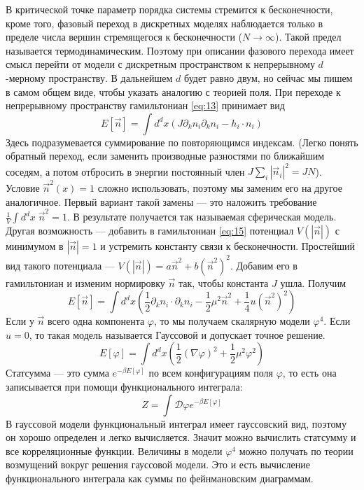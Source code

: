 \documentclass[a4paper,12pt]{article}
\theoremstyle{definition}
\theoremstyle{definition}
\theoremstyle{definition}
\begin{document}
В критической точке параметр порядка системы стремится к бесконечности, кроме того, фазовый переход в дискретных моделях наблюдается только в пределе числа вершин стремящегося к бесконечности ($N\to \infty$). Такой предел называется термодинамическим. Поэтому при описании фазового перехода имеет смысл перейти от модели с дискретным пространством  к непрерывному $d$-мерному пространству. В дальнейшем $d$ будет равно двум, но сейчас мы пишем в самом общем виде, чтобы указать аналогию с теорией поля.
При переходе к непрерывному пространству гамильтониан \eqref{eq:13} принимает вид
\begin{equation}
  \label{eq:15}
  E[\vec n]=\int d^d x \left(J\partial_kn_i\partial_k  n_i-h_i\cdot n_i\right)
\end{equation}
Здесь подразумевается суммирование по повторяющимся индексам. (Легко понять обратный переход, если заменить производные разностями по ближайшим соседям, а потом отбросить в энергии постоянный член $J\sum_i \left|\vec n_i\right|^2=JN$).
Условие $\vec n^2(x)=1$ сложно использовать, поэтому мы заменим его на другое аналогичное. Первый вариант такой замены --- это наложить требование $\frac{1}{V}\int d^dx\; \vec n^2=1$. В результате получается так называемая сферическая модель. Другая возможность --- добавить в гамильтониан \eqref{eq:15} потенциал $V(\left|\vec n\right|)$ с минимумом в $\left|\vec n\right|=1$ и устремить константу связи к бесконечности. Простейший вид такого потенциала --- $V(\left|\vec n\right|)=a\vec n^2+b\left(\vec n^2\right)^2$. Добавим его в гамильтониан и изменим нормировку $\vec n$ так, чтобы константа $J$ ушла. Получим
\begin{equation}
  \label{eq:16}
  E[\vec n]=\int d^d x \left(\frac{1}{2}\partial_k n_i\cdot \partial_k n_i-\frac{1}{2}\mu^2 \vec n^2+\frac{1}{4}u\left(\vec n^2\right)^2\right)
\end{equation}
Если у $\vec n$ всего одна компонента $\varphi$, то мы получаем скалярную модели $\varphi^4$. Если $u=0$, то такая модель называется Гауссовой и допускает точное решение.
\begin{equation}
  \label{eq:17}
  E[\varphi]=\int d^d x (\frac{1}{2}(\nabla \varphi)^2+\frac{1}{2}\mu^2 \varphi^2)
\end{equation}
Статсумма --- это сумма $e^{-\beta E[\varphi]}$ по всем конфигурациям поля $\varphi$, то есть она записывается при помощи функционального интеграла:
\begin{equation}
  \label{eq:18}
  Z=\int \mathcal{D}\varphi e^{-\beta E[\varphi]}
\end{equation}
В гауссовой модели функциональный интеграл имеет гауссовский вид, поэтому он хорошо определен и легко вычисляется. Значит можно вычислить статсумму и все корреляционные функции. Величины в модели $\varphi^4$ можно получать по теории возмущений вокруг решения гауссовой модели. Это и есть вычисление функционального интеграла как суммы по фейнмановским диаграммам. 
\end{document}
